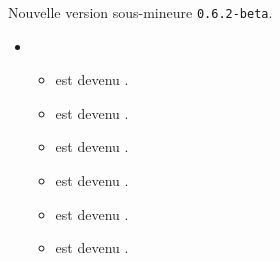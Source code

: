 Nouvelle version sous-mineure \verb+0.6.2-beta+.

\begin{itemize}[itemsep=.5em]
    \item {}
    \begin{itemize}[itemsep=.5em]
        \item {} est devenu .

        \item {} est devenu .

        \item {} est devenu .

        \item {} est devenu .

        \item {} est devenu .

        \item {} est devenu .
    \end{itemize}
\end{itemize}
